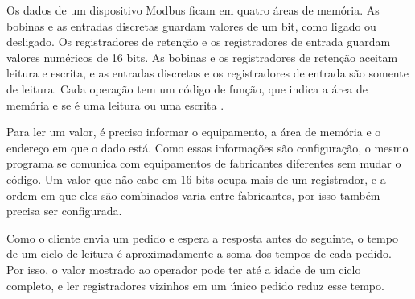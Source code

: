\par Os dados de um dispositivo Modbus ficam em quatro áreas de memória. As bobinas e as entradas discretas guardam valores de um bit, como ligado ou desligado. Os registradores de retenção e os registradores de entrada guardam valores numéricos de 16 bits. As bobinas e os registradores de retenção aceitam leitura e escrita, e as entradas discretas e os registradores de entrada são somente de leitura. Cada operação tem um código de função, que indica a área de memória e se é uma leitura ou uma escrita \cite{MODBUS_TCP_IMPLEMENTATION_GUIDE}.

\par Para ler um valor, é preciso informar o equipamento, a área de memória e o endereço em que o dado está. Como essas informações são configuração, o mesmo programa se comunica com equipamentos de fabricantes diferentes sem mudar o código. Um valor que não cabe em 16 bits ocupa mais de um registrador, e a ordem em que eles são combinados varia entre fabricantes, por isso também precisa ser configurada.

\par Como o cliente envia um pedido e espera a resposta antes do seguinte, o tempo de um ciclo de leitura é aproximadamente a soma dos tempos de cada pedido. Por isso, o valor mostrado ao operador pode ter até a idade de um ciclo completo, e ler registradores vizinhos em um único pedido reduz esse tempo.
